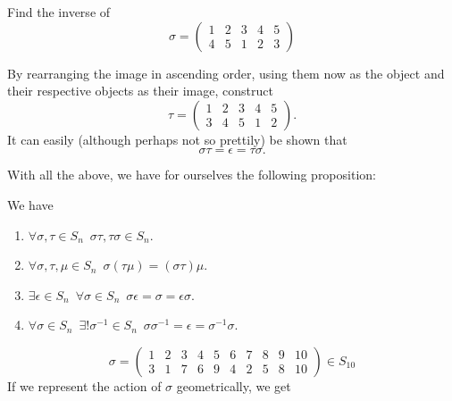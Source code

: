 \begin{eg}
  \label{eg:inverse_permutation}
  Find the inverse of
  \begin{equation*}
    \sigma = \begin{pmatrix}
      1 & 2 & 3 & 4 & 5 \\
      4 & 5 & 1 & 2 & 3
    \end{pmatrix}
  \end{equation*}

  \begin{solution}
    By rearranging the image in ascending order, using them now as the object and their respective objects as their image, construct
    \begin{equation*}
      \tau = \begin{pmatrix}
        1 & 2 & 3 & 4 & 5 \\
        3 & 4 & 5 & 1 & 2
      \end{pmatrix}.
    \end{equation*}
    It can easily (although perhaps not so prettily) be shown that
    \begin{equation*}
      \sigma \tau = \epsilon = \tau \sigma.
    \end{equation*}
  \end{solution}
\end{eg}

With all the above, we have for ourselves the following proposition:

\begin{propo}[Properties of $S_n$]\label{propo:properties_of_Sn}
  We have
  \begin{enumerate}
    \item $\forall \sigma, \tau \in S_n \enspace \sigma \tau, \tau \sigma \in S_n$.
    \item $\forall \sigma, \tau, \mu \in S_n \enspace \sigma (\tau \mu) = (\sigma \tau) \mu$.
    \item $\exists \epsilon \in S_n \enspace \forall \sigma \in S_n \enspace \sigma \epsilon = \sigma = \epsilon \sigma$.
    \item $\forall \sigma \in S_n \enspace \exists! \sigma^{-1} \in S_n \enspace \sigma \sigma^{-1} = \epsilon = \sigma^{-1} \sigma$.
  \end{enumerate}
\end{propo}

\begin{equation*}
  \sigma = \begin{pmatrix}
    1 & 2 & 3 & 4 & 5 & 6 & 7 & 8 & 9 & 10 \\
    3 & 1 & 7 & 6 & 9 & 4 & 2 & 5 & 8 & 10
  \end{pmatrix} \in S_{10}
\end{equation*}
If we represent the action of $\sigma$ geometrically, we get

